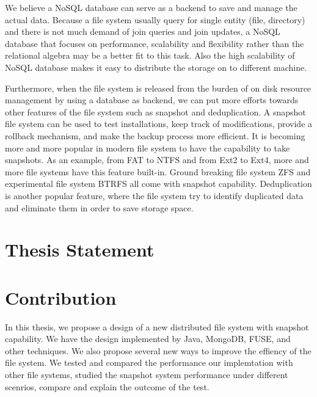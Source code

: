    We believe a NoSQL database can serve as a backend to save and manage the actual data. Because a file system usually query for single entity (file, directory) and there is not much demand of join queries and join updates, a NoSQL database that focuses on performance, scalability and flexibility rather than the relational algebra may be a better fit to this task. Also the high scalability of NoSQL database makes it easy to distribute the storage on to different machine.

    Furthermore, when the file system is released from the burden of on disk resource management by using a database as backend, we can put more efforts towards other features of the file system such as snapshot and deduplication. A snapshot file system can be used to test installations, keep track of modifications, provide a rollback mechanism, and make the backup process more efficient. It is becoming more and more popular in modern file system to have the capability to take snapshots. As an example, from FAT to NTFS and from Ext2 to Ext4, more and more file systems have this feature built-in. Ground breaking file system ZFS and experimental file system BTRFS all come with snapshot capability. Deduplication is another popular feature, where the file system try to identify duplicated data and eliminate them in order to save storage space.

\section{Thesis Statement}

    

\section{Contribution}

    In this thesis, we propose a design of a new distributed file system with snapshot capability. We have the design implemented by Java, MongoDB, FUSE, and other techniques. We also propose several new ways to improve the effiency of the file system. We tested and compared the performance our implemtation with other file systems, studied the snapshot system performance under different scenrios, compare and explain the outcome of the test.
